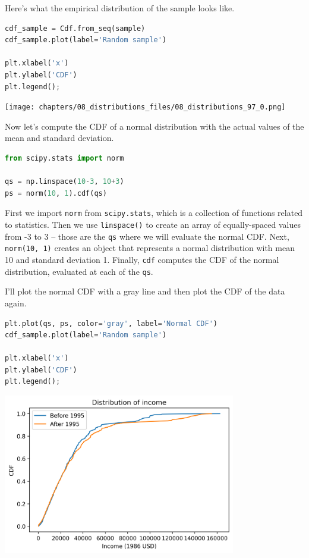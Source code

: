 Here's what the empirical distribution of the sample looks like.

\begin{lstlisting}[language=Python,style=source]
cdf_sample = Cdf.from_seq(sample)
cdf_sample.plot(label='Random sample')

plt.xlabel('x')
plt.ylabel('CDF')
plt.legend();
\end{lstlisting}

\begin{center}
\texttt{[image: chapters/08\_distributions\_files/08\_distributions\_97\_0.png]}
\end{center}

Now let's compute the CDF of a normal distribution with the actual
values of the mean and standard deviation.

\begin{lstlisting}[language=Python,style=source]
from scipy.stats import norm

qs = np.linspace(10-3, 10+3)
ps = norm(10, 1).cdf(qs)
\end{lstlisting}

First we import \passthrough{\lstinline!norm!} from
\passthrough{\lstinline!scipy.stats!}, which is a collection of
functions related to statistics. Then we use
\passthrough{\lstinline!linspace()!} to create an array of
equally-spaced values from -3 to 3 -- those are the
\passthrough{\lstinline!qs!} where we will evaluate the normal CDF.
Next, \passthrough{\lstinline!norm(10, 1)!} creates an object that
represents a normal distribution with mean 10 and standard deviation 1.
Finally, \passthrough{\lstinline!cdf!} computes the CDF of the normal
distribution, evaluated at each of the \passthrough{\lstinline!qs!}.

I'll plot the normal CDF with a gray line and then plot the CDF of the
data again.

\begin{lstlisting}[language=Python,style=source]
plt.plot(qs, ps, color='gray', label='Normal CDF')
cdf_sample.plot(label='Random sample')

plt.xlabel('x')
plt.ylabel('CDF')
plt.legend();
\end{lstlisting}

\begin{center}
\includegraphics[width=4in]{chapters/08_distributions_files/08_distributions_101_0.png}
\end{center}

